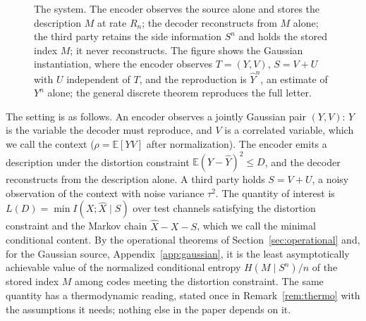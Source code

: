 \documentclass[11pt,onecolumn]{IEEEtran}
\newcommand{\E}{\mathbb{E}}
\newcommand{\hX}{\widehat{X}}
\newcommand{\hY}{\widehat{Y}}
\begin{document}
\begin{figure}[!t]
\centering
{}
\caption{The system. The encoder observes the source alone and stores
the description $M$ at rate $R_n$; the decoder reconstructs from $M$ alone;
the third party retains the side information $S^n$ and holds the stored
index $M$; it never reconstructs. The figure shows the Gaussian
instantiation, where the encoder observes $T=(Y,V)$, $S=V+U$ with $U$
independent of $T$, and
the reproduction is $\hY^n$, an estimate of $Y^n$ alone; the general
discrete theorem reproduces the full letter.}
\label{fig:system}
\end{figure}


The setting is as follows. An encoder observes a jointly Gaussian pair
$(Y,V)$: $Y$ is the variable the decoder must reproduce, and $V$ is a
correlated variable, which we call the context ($\rho=\E[YV]$ after
normalization). The encoder emits a description under the distortion
constraint $\E(Y-\hY)^2\le D$, and the decoder reconstructs from the
description alone. A third party holds $S=V+U$, a noisy observation of
the context with noise variance $\tau^2$. The quantity of interest is
$L(D)=\min I(X;\hX\mid S)$ over test channels satisfying the distortion
constraint and the Markov chain $\hX-X-S$, which we call the minimal
conditional content. By the operational theorems of
Section~\ref{sec:operational} and, for the Gaussian source,
Appendix~\ref{app:gaussian}, it is the least asymptotically achievable
value of the normalized conditional entropy $H(M\mid S^n)/n$ of the stored
index $M$ among codes meeting the distortion constraint. The same
quantity has a thermodynamic reading, stated once in
Remark~\ref{rem:thermo} with the assumptions it needs; nothing else in
the paper depends on it.
\end{document}
